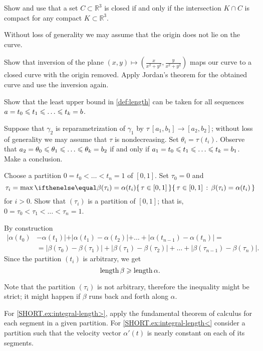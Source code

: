 Show and use that a set $C\subset \mathbb{R}^3$ is closed if and only if the intersection $K\cap C$ is compact for any compact $K\subset \mathbb{R}^3$.

Without loss of generality we may assume that the origin does not lie on the curve.

Show that inversion of the plane $(x,y)\mapsto (\tfrac{x}{x^2+y^2},\tfrac{y}{x^2+y^2})$ maps our curve to a closed curve with the origin removed.
Apply Jordan's theorem for the obtained curve and use the inversion again.

\setcounter{eqtn}{0}

Show that the least upper bound in \ref{def:length} can be taken for all sequences
$a=t_0\le t_1\le\z\dots\le t_k=b$.

Suppose that $\gamma_2$ is reparametrization of $\gamma_1$ by $\tau\:[a_1,b_1]\to [a_2,b_2]$;
without loss of generality we may assume that $\tau$ is nondecreasing.
Set $\theta_i=\tau(t_i)$.
Observe that $a_2=\theta_0\z\le\theta_1\le \z\dots\le\theta_k=b_2$ if and only if 
$a_1=t_0\le t_1\le\z\dots\le t_k=b_1$.
Make a conclusion.

Choose a partition $0=t_0<\dots <t_n=1$ of $[0,1]$.
Set $\tau_0=0$ and 
\[\tau_i=\max\set{\tau \in[0,1]}{\beta(\tau_i)=\alpha(t_i)}\]
for $i>0$.
Show that $(\tau_i)$ is a partition of $[0,1]$;
that is, $0=\tau_0<\tau_1<\dots<\tau_n=1$.

By construction 
\begin{align*}
|\alpha(t_0)&-\alpha(t_1)|+|\alpha(t_1)-\alpha(t_2)|+\dots+|\alpha(t_{n-1})-\alpha(t_n)|=
\\
&=
|\beta(\tau_0)-\beta(\tau_1)|+|\beta(\tau_1)-\beta(\tau_2)|+\dots+|\beta(\tau_{n-1})-\beta(\tau_n)|.
\end{align*}
Since the partition $(t_i)$ is arbitrary, we get 
\[\mathop{\rm length}\nolimits \beta\geqslant \mathop{\rm length}\nolimits \alpha.\]

Note that the partition $(\tau_i)$ is not arbitrary, therefore the inequality might be strict; it might happen if $\beta$ runs back and forth along $\alpha$.




For \ref{SHORT.ex:integral-length>}, apply the fundamental theorem of calculus for each segment in a given partition.
For \ref{SHORT.ex:integral-length<} consider a partition such that the velocity vector $\alpha'(t)$ is nearly constant on each of its segments.

